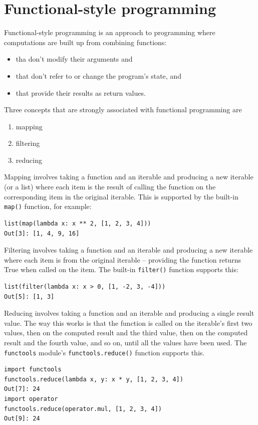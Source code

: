 \section{Functional-style programming}


Functional-style programming is an approach to programming where computations are built up from combining functions:
\begin{itemize}
\item tha don't modify their arguments and 
\item that don't refer to or change the program's state, and 
\item that provide their results as return values.
\end{itemize}



Three concepts that are strongly associated with functional programming are
\begin{enumerate}
\item mapping
\item filtering
\item reducing
\end{enumerate}


Mapping involves taking a function and an iterable and producing a new iterable (or a list) where each item is the result of calling the function on the corresponding item in the original iterable.
This is supported by the built-in \verb|map()| function, for example:
\begin{lstlisting}
list(map(lambda x: x ** 2, [1, 2, 3, 4]))
Out[3]: [1, 4, 9, 16]  
\end{lstlisting}



Filtering involves taking a function and an iterable and producing a new iterable where each item is from the original iterable -- providing the function returns True when called on the item.
The built-in \verb|filter()| function supports this:
\begin{lstlisting}
list(filter(lambda x: x > 0, [1, -2, 3, -4]))
Out[5]: [1, 3]  
\end{lstlisting}


Reducing involves taking a function and an iterable and producing a single result value.
The way this works is that the function is called on the iterable’s first two values, then on the computed result and the third value, then on the computed result and the fourth value, and so on, until all the values have been used. 
The \verb|functools| module's \verb|functools.reduce()| function supports this.
\begin{lstlisting}
import functools
functools.reduce(lambda x, y: x * y, [1, 2, 3, 4])
Out[7]: 24
import operator
functools.reduce(operator.mul, [1, 2, 3, 4])
Out[9]: 24
\end{lstlisting}


